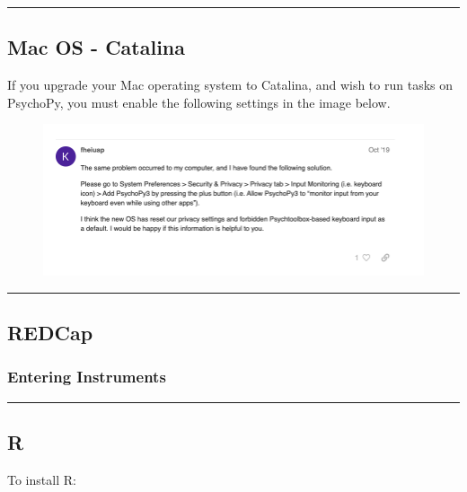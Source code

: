 \documentclass[]{book}
\begin{document}
\begin{center}\rule{0.5\linewidth}{\linethickness}\end{center}

\hypertarget{mac-os---catalina}{%
\subsection{Mac OS - Catalina}\label{mac-os---catalina}}

If you upgrade your Mac operating system to Catalina, and wish to run tasks on PsychoPy, you must enable the following settings in the image below.

\begin{figure}
\centering
\includegraphics{images/lab_protocols/catalina/1.png}
\caption{}
\end{figure}

\begin{center}\rule{0.5\linewidth}{\linethickness}\end{center}

\hypertarget{redcap}{%
\subsection{REDCap}\label{redcap}}

\hypertarget{entering-instruments}{%
\subsubsection{Entering Instruments}\label{entering-instruments}}

\begin{center}\rule{0.5\linewidth}{\linethickness}\end{center}

\hypertarget{r}{%
\subsection{R}\label{r}}

To install R:
\end{document}
